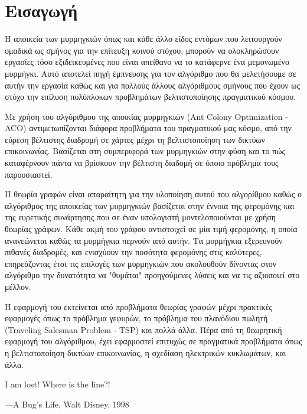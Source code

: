 \section{Εισαγωγή}
Η αποικεία των μυρμηγκιών όπως και κάθε άλλο είδος εντόμων που λειτουργούν ομαδικά ως σμήνος για την επίτευξη κοινού στόχου, μπορούν να ολοκληρώσουν εργασίες τόσο εξιδεικευμένες που είναι απείθανο να το κατάφερνε ένα μεμονωμένο μυρμήγκι. Αυτό αποτελεί πηγή έμπνευσης για τον αλγόριθμο που θα μελετήσουμε σε αυτήν την εργασία καθώς και για πολλούς άλλους αλγόριθμους σμήνους που έχουν ως στόχο την επίλυση πολύπλοκων προβλημάτων βελτιστοποίησης πραγματικού κόσμου. \cite{Dorigo-Stützle2}

Με χρήση του αλγόριθμου της αποικίας μυρμηγκιών (Ant Colony Optimization - ACO) αντιμετωπίζονται διάφορα προβλήματα του πραγματικού μας κόσμο, από την εύρεση βέλτιστης διαδρομή σε χάρτες μέχρι τη βελτιστοποίηση των δικτύων επικοινωνίας. Βασίζεται στη συμπεριφορά των μυρμηγκιών στην φύση και το πώς καταφέρνουν πάντα να βρίσκουν την βέλτιστη διαδομή σε όποιο πρόβλημα τους παρουσιαστεί.

Η θεωρία γραφών είναι απαραίτητη για την υλοποίηση αυτού του αλγορίθμου καθώς ο αλγόριθμος της αποικείας των μυρμηγκιών βασίζεται στην έννοια της φερομόνης και της ευρετικής συνάρτησης που σε έναν υπολογιστή μοντελοποιούνται με χρήση θεωρίας γράφων. Κάθε ακμή του γράφου αντιστοιχεί σε μία τιμή φερομόνης, η οποία ανανεώνεται καθώς τα μυρμήγκια περνούν από αυτήν. Τα μυρμήγκια εξερευνούν πιθανές διαδρομές, και ενισχύουν την ποσότητα φερομόνης στις καλύτερες, επηρεάζοντας έτσι τις επιλογές των μυρμηγκιών που ακολουθούν δίνοντας στον αλγόριθμο την δυνατότητα να "θυμάται" προηγούμενες λύσεις και να τις αξιοποιεί στο μέλλον.

Η εφαρμογή του εκτείνεται από προβλήματα θεωρίας γραφών μέχρι πρακτικές εφαρμογές όπως το πρόβλημα γεφυρών, το πρόβλημα του πλανόδιου πωλητή (Traveling Salesman Problem - TSP) και πολλά άλλα. Πέρα από τη θεωρητική εφαρμογή του αλγόριθμου, έχει εφαρμοστεί επιτυχώς σε πραγματικά προβλήματα όπως η βελτιστοποίηση δικτύων επικοινωνίας, η σχεδίαση ηλεκτρικών κυκλωμάτων, και άλλα.


\begin{flushright}
    I am lost! Where is the line?!
    
    —A Bug’s Life, Walt Disney, 1998
\end{flushright}



